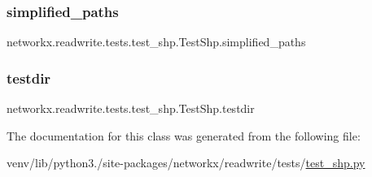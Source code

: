 \subsubsection{\texorpdfstring{simplified\+\_\+paths}{simplified\_paths}}
{\footnotesize\ttfamily networkx.\+readwrite.\+tests.\+test\+\_\+shp.\+Test\+Shp.\+simplified\+\_\+paths}

\mbox{\label{classnetworkx_1_1readwrite_1_1tests_1_1test__shp_1_1TestShp_af57372342a141cb984b5bfc996ad6f79}} 
\subsubsection{\texorpdfstring{testdir}{testdir}}
{\footnotesize\ttfamily networkx.\+readwrite.\+tests.\+test\+\_\+shp.\+Test\+Shp.\+testdir}



The documentation for this class was generated from the following file\+:\begin{DoxyCompactItemize}
\item 
venv/lib/python3./site-\/packages/networkx/readwrite/tests/\hyperlink{test__shp_8py}{test\+\_\+shp.\+py}\end{DoxyCompactItemize}
